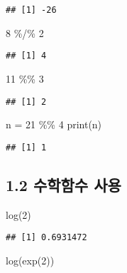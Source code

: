 \documentclass[
]{article}
\newenvironment{Shaded}{\begin{snugshade}}{\end{snugshade}}
\newcommand{\DecValTok}[1]{\textcolor[rgb]{0.00,0.00,0.81}{#1}}
\newcommand{\FunctionTok}[1]{\textcolor[rgb]{0.00,0.00,0.00}{#1}}
\newcommand{\NormalTok}[1]{#1}
\newcommand{\OtherTok}[1]{\textcolor[rgb]{0.56,0.35,0.01}{#1}}
\newcommand{\SpecialCharTok}[1]{\textcolor[rgb]{0.00,0.00,0.00}{#1}}
\begin{document}
\begin{verbatim}
## [1] -26
\end{verbatim}

\begin{Shaded}
\begin{Highlighting}[]
\DecValTok{8} \SpecialCharTok{\%/\%} \DecValTok{2}
\end{Highlighting}
\end{Shaded}

\begin{verbatim}
## [1] 4
\end{verbatim}

\begin{Shaded}
\begin{Highlighting}[]
\DecValTok{11} \SpecialCharTok{\%\%} \DecValTok{3}
\end{Highlighting}
\end{Shaded}

\begin{verbatim}
## [1] 2
\end{verbatim}

\begin{Shaded}
\begin{Highlighting}[]
\NormalTok{n }\OtherTok{=} \DecValTok{21} \SpecialCharTok{\%\%} \DecValTok{4}
\FunctionTok{print}\NormalTok{(n)}
\end{Highlighting}
\end{Shaded}

\begin{verbatim}
## [1] 1
\end{verbatim}

\hypertarget{uxc218uxd559uxd568uxc218-uxc0acuxc6a9}{%
\subsection{1.2 수학함수
사용}\label{uxc218uxd559uxd568uxc218-uxc0acuxc6a9}}

\begin{Shaded}
\begin{Highlighting}[]
\FunctionTok{log}\NormalTok{(}\DecValTok{2}\NormalTok{)}
\end{Highlighting}
\end{Shaded}

\begin{verbatim}
## [1] 0.6931472
\end{verbatim}

\begin{Shaded}
\begin{Highlighting}[]
\FunctionTok{log}\NormalTok{(}\FunctionTok{exp}\NormalTok{(}\DecValTok{2}\NormalTok{))}
\end{Highlighting}
\end{Shaded}
\end{document}
